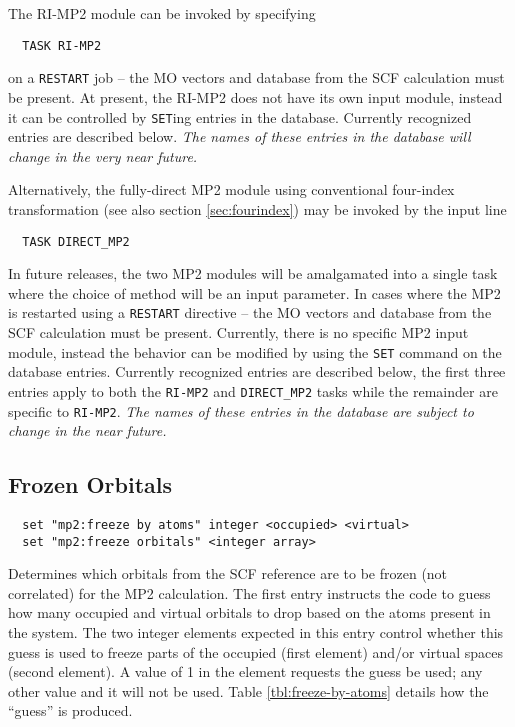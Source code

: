 \label{sec:mp2}
The RI-MP2 module can be invoked by specifying

\begin{verbatim}
  TASK RI-MP2
\end{verbatim}
on a \verb+RESTART+ job -- the MO vectors and database from the SCF
calculation must be present.  At present, the RI-MP2 does not have its
own input module, instead it can be controlled by \verb+SET+ing
entries in the database.  Currently recognized entries are described
below. {\em The names of these entries in the database will change in
the very near future.}

Alternatively, the fully-direct MP2 module using conventional
four-index transformation (see also section \ref{sec:fourindex}) may be
invoked by the input line
\begin{verbatim}
  TASK DIRECT_MP2
\end{verbatim}
In future releases, the two MP2 modules will be amalgamated into a
single task where the choice of method will be an input parameter.  In
cases where the MP2 is restarted using a \verb+RESTART+ directive --
the MO vectors and database from the SCF calculation must be present.
Currently, there is no specific MP2 input module, instead the
behavior can be modified by using the \verb+SET+ command on the
database entries. Currently recognized entries are described below,
the first three entries apply to both the \verb+RI-MP2+ and
\verb+DIRECT_MP2+ tasks while the remainder are specific to
\verb+RI-MP2+.  {\em The names of these entries in the database are
subject to change in the near future.}

\subsection{Frozen Orbitals}

\begin{verbatim}
  set "mp2:freeze by atoms" integer <occupied> <virtual>
  set "mp2:freeze orbitals" <integer array>
\end{verbatim}

Determines which orbitals from the SCF reference are to be frozen (not
correlated) for the MP2 calculation.  The first entry instructs the
code to guess how many occupied and virtual orbitals to drop based on
the atoms present in the system.  The two integer elements expected in
this entry control whether this guess is used to freeze parts of the
occupied (first element) and/or virtual spaces (second element).  A
value of 1 in the element requests the guess be used; any other value
and it will not be used.  Table \ref{tbl:freeze-by-atoms} details how
the ``guess'' is produced.

